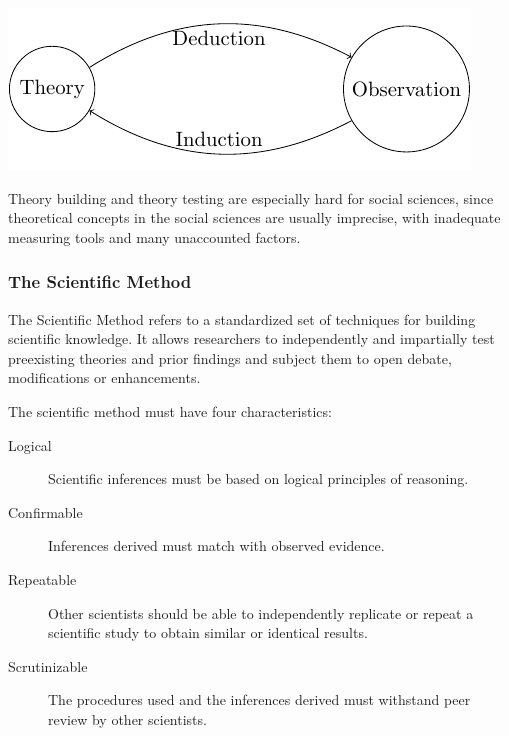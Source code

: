 


\begin{center}
  \includegraphics{cycle-of-research.pdf}
\end{center}

Theory building and theory testing are especially hard for social
sciences, since theoretical concepts in the social sciences are
usually imprecise, with inadequate measuring tools and many
unaccounted factors.

\subsubsection{The Scientific Method}

The Scientific Method refers to a standardized set of techniques for
building scientific knowledge. It allows researchers to independently
and impartially test preexisting theories and prior findings and
subject them to open debate, modifications or enhancements.

The scientific method must have four characteristics:

\begin{adjustwidth}{0.5cm}{}
\begin{description}
  \item[Logical] Scientific inferences must be based on logical principles of reasoning.
  \item[Confirmable] Inferences derived must match with observed evidence.
  \item[Repeatable] Other scientists should be able to independently
    replicate or repeat a scientific study to obtain similar or
    identical results.
  \item[Scrutinizable] The procedures used and the inferences derived
    must withstand peer review by other scientists.
\end{description}
\end{adjustwidth}

